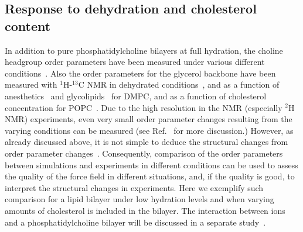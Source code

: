 \documentclass[journal=jacsat,manuscript=article]{achemso}
\begin{document}
\subsection{Response to dehydration and cholesterol content}
In addition to pure phosphatidylcholine bilayers at full hydration, the choline headgroup order parameters
have been measured under various different conditions~\cite{gally75,brown77,brown78,akutsu81,altenbach84,scherer89,bechinger91,ulrich94,dvinskikh05b,castro08,kapla12,ferreira13}.
Also the order parameters for the glycerol backbone have been measured with $^1$H-$^{13}$C NMR in dehydrated conditions~\cite{dvinskikh05b}, and as a function 
of anesthetics~\cite{castro08} and glycolipids~\cite{kapla12} for DMPC, and as a function of cholesterol 
concentration for POPC~\cite{ferreira13}. Due to the high resolution in the NMR (especially $^2$H NMR) experiments,
even very small order parameter changes resulting from the varying conditions can be measured 
(see Ref.~ for more discussion.) 
However, as already discussed above, it is not simple to deduce 
the structural changes from order parameter changes~\cite{akutsu91,semchyschyn04}. Consequently, comparison of the order parameters
between simulations and experiments in different conditions can be used to assess the quality of the force field 
in different situations, and, if the quality is good, to interpret the structural changes in experiments.
Here we exemplify such comparison for a lipid bilayer under low hydration levels and when varying amounts of cholesterol is included in the bilayer. 
The interaction between ions and a phosphatidylcholine bilayer will be discussed in a separate study~\cite{ionpaper}.
\end{document}
